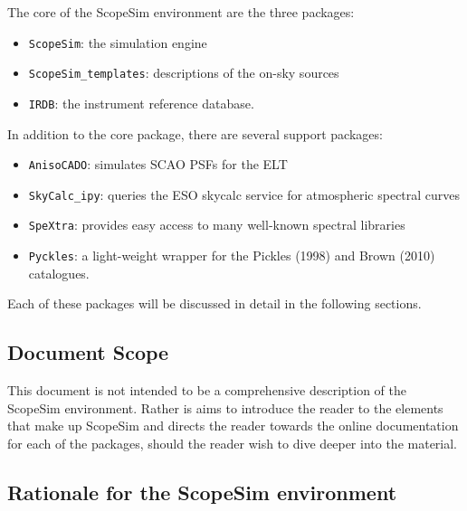 The core of the ScopeSim environment are the three packages:

\begin{itemize}
\item \texttt{ScopeSim}: the simulation engine

\item \texttt{ScopeSim\_templates}: descriptions of the on-sky sources

\item \texttt{IRDB}: the instrument reference database.
\end{itemize}

In addition to the core package, there are several support packages:

\begin{itemize}
\item \texttt{AnisoCADO}: simulates SCAO PSFs for the ELT

\item \texttt{SkyCalc\_ipy}: queries the ESO skycalc service for atmospheric spectral curves

\item \texttt{SpeXtra}: provides easy access to many well-known spectral libraries

\item \texttt{Pyckles}: a light-weight wrapper for the Pickles (1998) and Brown (2010) catalogues.
\end{itemize}

Each of these packages will be discussed in detail in the following sections.


\subsection{Document Scope%
  \label{document-scope}%
}

This document is not intended to be a comprehensive description of the ScopeSim environment. Rather is aims to introduce the reader to the elements that make up ScopeSim and directs the reader towards the online documentation for each of the packages, should the reader wish to dive deeper into the material.


\subsection{Rationale for the ScopeSim environment%
  \label{rationale-for-the-scopesim-environment}%
}

